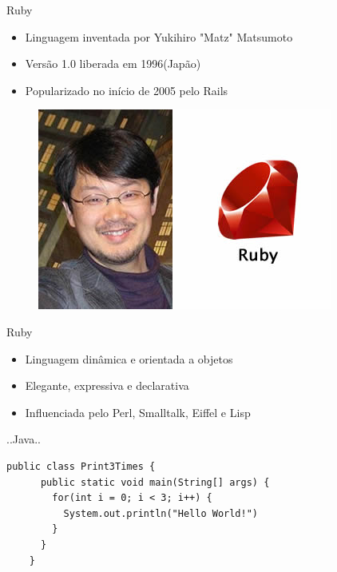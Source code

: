 \begin{frame}[fragile,t]{Ruby}
  \begin{itemize}
    \item Linguagem inventada por Yukihiro "Matz" Matsumoto
    \item Versão 1.0 liberada em 1996(Japão)
    \item Popularizado no início de 2005 pelo Rails
  \end{itemize}   
  \begin{figure}[hbt]
    \includegraphics[scale=.5]{imagens/matz.jpg}
  \end{figure}
\end{frame}
\begin{frame}[fragile,t]{Ruby}
  \begin{itemize}
    \item Linguagem \alert{dinâmica} e \alert{orientada a objetos}
    \item Elegante, \alert{expressiva} e declarativa
    \item Influenciada pelo Perl, Smalltalk, Eiffel e Lisp
  \end{itemize}   
\end{frame}
\begin{frame}[fragile,t]{..Java..}
  \begin{lstlisting}[style=JavaInputStyle]
    public class Print3Times {
      public static void main(String[] args) {
        for(int i = 0; i < 3; i++) {
          System.out.println("Hello World!")
        }
      }
    }
  \end{lstlisting}
\end{frame}
